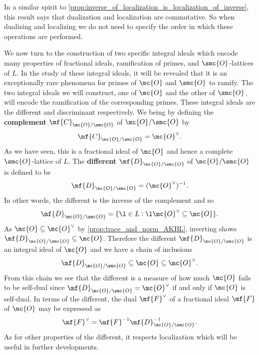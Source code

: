 \documentclass[12pt]{article}
\begin{document}
      In a similar spirit to \cref{prop:inverse_of_localization_is_localization_of_inverse}, this result says that dualization and localization are commutative. So when dualizing and localizing we do not need to specify the order in which these operations are performed.
      
      We now turn to the construction of two specific integral ideals which encode many properties of fractional ideals, ramification of primes, and \(\smc{O}\)-lattices of \(L\). In the study of these integral ideals, it will be revealed that it is an exceptionally rare phenomena for primes of \(\mc{O}\) and \(\smc{O}\) to ramify. The two integral ideals we will construct, one of \(\mc{O}\) and the other of \(\smc{O}\), will encode the ramification of the corresponding primes. These integral ideals are the different and discriminant respectively. We being by defining the \textbf{complement} \(\mf{C}_{\mc{O}/\smc{O}}\) of \(\mc{O}/\smc{O}\) by
      \[
        \mf{C}_{\mc{O}/\smc{O}} = \mc{O}^{\vee}.  
      \]
      As we have seen, this is a fractional ideal of \(\mc{O}\) and hence a complete \(\smc{O}\)-lattice of \(L\). The \textbf{different} \(\mf{D}_{\mc{O}/\smc{O}}\) of \(\mc{O}/\smc{O}\) is defined to be
      \[
        \mf{D}_{\mc{O}/\smc{O}} = (\mc{O}^{\vee})^{-1}.  
      \]
      In other words, the different is the inverse of the complement and so
      \[
        \mf{D}_{\mc{O}/\smc{O}} = \{\l \in L: \l\mc{O}^{\vee} \subseteq \mc{O}\}.  
      \]
      As \(\mc{O} \subseteq \mc{O}^{\vee}\) by \cref{prop:trace_and_norm_AKBL}, inverting shows \(\mf{D}_{\mc{O}/\smc{O}} \subseteq \mc{O}\). Therefore the different \(\mf{D}_{\mc{O}/\smc{O}}\) is an integral ideal of \(\mc{O}\) and we have a chain of inclusions
      \[
        \mf{D}_{\mc{O}/\smc{O}} \subseteq \mc{O} \subseteq \mc{O}^{\vee}.
      \]
      From this chain we see that the different is a measure of how much \(\mc{O}\) fails to be self-dual since \(\mf{D}_{\mc{O}/\smc{O}} = \mc{O}^{\vee}\) if and only if \(\mc{O}\) is self-dual. In terms of the different, the dual \(\mf{F}^{\vee}\) of a fractional ideal \(\mf{F}\) of \(\mc{O}\) may be expressed as
      \begin{equation}\label{equ:dual_in_terms_of_inverse_and_different}
        \mf{F}^{\vee} = \mf{F}^{-1}\mf{D}_{\mc{O}/\smc{O}}^{-1}.
      \end{equation}
      As for other properties of the different, it respects localization which will be useful in further developments.
\end{document}
